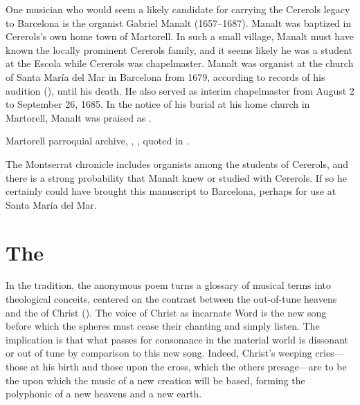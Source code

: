 One musician who would seem a likely candidate for carrying the Cererols legacy
to Barcelona is the organist Gabriel Manalt (1657--1687).%
    \Autocite{Balanza:CererolsFamily}
Manalt was baptized in Cererols's own home town of Martorell.
In such a small village, Manalt must have known the locally prominent Cererols
family, and it seems likely he was a student at the Escola while Cererols was
chapelmaster.
Manalt was organist at the church of Santa María del Mar in Barcelona from 1679,
according to records of his audition (), until his death.
He also served as interim chapelmaster from August 2 to September 26, 1685.%
    \Autocite[70--71]{Balanza:CererolsFamily}
In the notice of his burial at his home church in Martorell, Manalt was praised
as .%
\begin{Footnote}
    Martorell parroquial archive, ,
    , quoted in 
    \autocite[70]{Balanza:CererolsFamily}.
\end{Footnote}
The Montserrat chronicle includes organists among the students of Cererols, and
there is a strong probability that Manalt knew or studied with Cererols.
If so he certainly could have brought this manuscript to Barcelona, perhaps
for use at Santa María del Mar.



\section{The }

In the  tradition, the anonymous poem turns a glossary of
musical terms into theological conceits, centered on the contrast between the
out-of-tune heavens and the  of Christ
().
The voice of Christ as incarnate Word is the new song before which the spheres
must cease their chanting and simply listen.
The implication is that what passes for consonance in the material world is
dissonant or out of tune by comparison to this new song.
Indeed, Christ's weeping cries---those at his birth and those upon the cross,
which the others presage---are to be the  upon which the
music of a new creation will be based, forming the polyphonic 
of a new heavens and a new earth.

